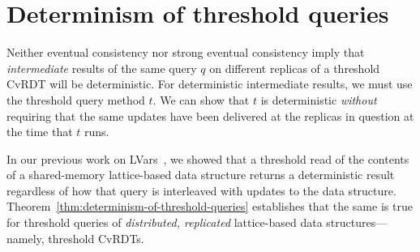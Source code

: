 \section{Determinism of threshold queries}\label{s:results}

Neither eventual consistency nor strong eventual consistency imply
that \emph{intermediate} results of the same query $q$ on different
replicas of a threshold CvRDT will be deterministic.  For
deterministic intermediate results, we must use the threshold query
method $t$.  We can show that $t$ is deterministic \emph{without}
requiring that the same updates have been delivered at the replicas in
question at the time that $t$ runs.

In our previous work on LVars~\cite{LVars-paper,Freeze-paper}, we
showed that a threshold read of the contents of a shared-memory
lattice-based data structure returns a deterministic result regardless
of how that query is interleaved with updates to the data structure.
Theorem~\ref{thm:determinism-of-threshold-queries} establishes that
the same is true for threshold queries of \emph{distributed,
  replicated} lattice-based data structures---namely, threshold
CvRDTs.

